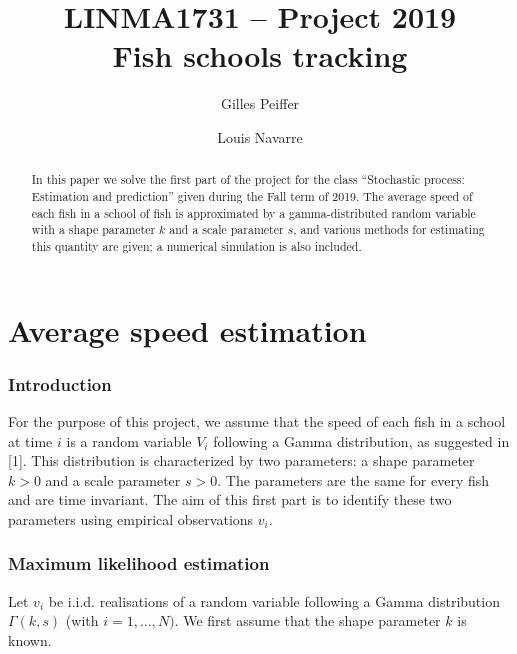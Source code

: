 \documentclass[final]{aomart}
\title[Fish schools tracking]{LINMA1731 -- Project 2019\\
Fish schools tracking}
\author{Gilles Peiffer}
\author{Louis Navarre}
\newtheorem[{}\it]{thm}{Theorem}[section]
\theoremstyle{definition}
\newtheorem*[{}\it]{notation}{Notation}
\numberwithin{equation}{section}
\begin{document}
\begin{abstract}
	In this paper we solve the first part of the project for the class ``Stochastic process: Estimation and prediction'' given during the Fall term of 2019.
	The average speed of each fish in a school of fish is approximated by a gamma-distributed random variable with a shape parameter \(k\) and a scale parameter \(s\), and various methods for estimating this quantity are given; a numerical simulation is also included.
\end{abstract}

\maketitle
\tableofcontents

\part{Average speed estimation}
\section{Introduction}
For the purpose of this project, we assume that the speed of each fish in a school
at time \(i\) is a random variable \(V_i\) following a Gamma distribution, as suggested in [1].
This distribution is characterized by two parameters:
a shape parameter \(k > 0\) and a scale parameter \(s > 0\).
The parameters are the same for every fish and are time invariant.
The aim of this first part is to identify these two parameters using empirical observations \(v_i\).

\section{Maximum likelihood estimation}
Let \(v_i\) be i.i.d. realisations of a random variable following a Gamma distribution \(\Gamma(k, s)\) (with \(i = 1,\ldots, N)\).
We first assume that the shape parameter \(k\) is known.
\end{document}
